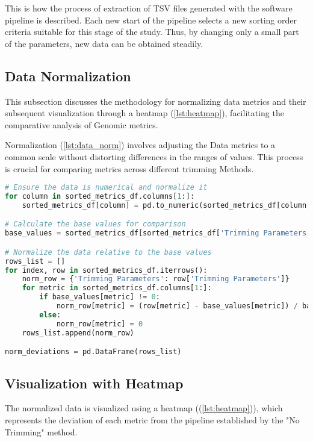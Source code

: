 This is how the process of extraction of TSV files generated with the software pipeline is described. Each new start of the pipeline selects a new sorting order criteria suitable for this stage of the study. Thus, by changing only a small part of the parameters, new data can be obtained steadily.

\subsection{Data Normalization}\label{sec:data_normalization}
This subsection discusses the methodology for normalizing data metrics and their subsequent visualization through a \gls{heatmap} (\autoref{lst:heatmap}), facilitating the comparative analysis of Genomic \gls{metrics}.

Normalization (\autoref{lst:data_norm}) involves adjusting the Data \gls{metrics} to a common scale without distorting differences in the ranges of values. This process is crucial for comparing \gls{metrics} across different \gls{trimming} Methods.

\begin{lstlisting}[language=Python, label={lst:data_norm}, caption=Data Normalization Process]
# Ensure the data is numerical and normalize it
for column in sorted_metrics_df.columns[1:]:
    sorted_metrics_df[column] = pd.to_numeric(sorted_metrics_df[column], errors='coerce')

# Calculate the base values for comparison
base_values = sorted_metrics_df[sorted_metrics_df['Trimming Parameters'] == 'NoTrimming'].iloc[0, 1:]

# Normalize the data relative to the base values
rows_list = []
for index, row in sorted_metrics_df.iterrows():
    norm_row = {'Trimming Parameters': row['Trimming Parameters']}
    for metric in sorted_metrics_df.columns[1:]:
        if base_values[metric] != 0:
            norm_row[metric] = (row[metric] - base_values[metric]) / base_values[metric]
        else:
            norm_row[metric] = 0
    rows_list.append(norm_row)

norm_deviations = pd.DataFrame(rows_list)
\end{lstlisting}

\subsection{Visualization with Heatmap}\label{sec:visualization_heatmap}
The normalized data is visualized using a \gls{heatmap} ((\autoref{lst:heatmap})), which represents the \gls{deviation} of each metric from the pipeline established by the "No Trimming" method.

